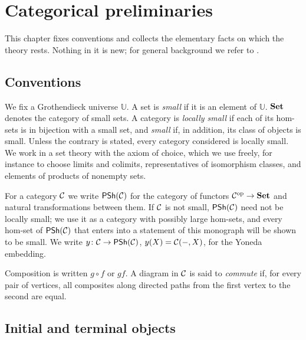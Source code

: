 \chapter{Categorical preliminaries}\label{ch:prelim}

This chapter fixes conventions and collects the elementary facts on which the
theory rests. Nothing in it is new; for general background we refer to
\cite{MacLane1998,Riehl2016,Leinster2014,Borceux1994}.

\section{Conventions}\label{sec:conventions}

\begin{convention}[Size]\label{conv:size}
We fix a Grothendieck universe $\mathbb U$. A set is \emph{small} if it is an
element of $\mathbb U$. $\mathbf{Set}$ denotes the category of small sets. A category
is \emph{locally small} if each of its hom-sets is in bijection with a small
set, and \emph{small} if, in addition, its class of objects is small. Unless
the contrary is stated, every category considered is locally small. We work in
a set theory with the axiom of choice, which we use freely, for instance to
choose limits and colimits, representatives of isomorphism classes, and
elements of products of nonempty sets.
\end{convention}

\begin{convention}[Presheaves]\label{conv:presheaves}
For a category $\mathcal{C}$ we write $\mathsf{PSh}(\mathcal{C})$ for the category of functors
$\mathcal{C}^{\mathrm{op}}\to\mathbf{Set}$ and natural transformations between them. If $\mathcal{C}$ is not
small, $\mathsf{PSh}(\mathcal{C})$ need not be locally small; we use it as a category with
possibly large hom-sets, and every hom-set of $\mathsf{PSh}(\mathcal{C})$ that enters into
a statement of this monograph will be shown to be small. We write
$y\colon\mathcal{C}\to\mathsf{PSh}(\mathcal{C})$, $y(X)=\mathcal{C}(-,X)$, for the Yoneda embedding.
\end{convention}

\begin{convention}\label{conv:diagrams}
Composition is written $g\circ f$ or $gf$. A diagram in $\mathcal{C}$ is said to
\emph{commute} if, for every pair of vertices, all composites along directed
paths from the first vertex to the second are equal.
\end{convention}

\section{Initial and terminal objects}\label{sec:initial-terminal}

